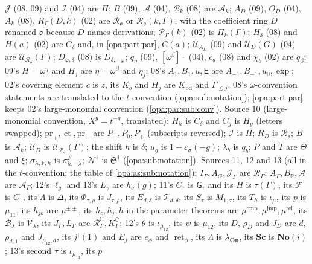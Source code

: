 \documentclass[11pt,oneside]{article}
\numberwithin{equation}{section}
\theoremstyle{definition}
\theoremstyle{remark}
\newcommand{\SC}{\mathbf{No}(i)}
\newcommand{\R}{\mathbb R}
\newcommand{\C}{\mathbb C}
\newcommand{\oo}{\mathfrak o}
\newcommand{\Ak}{\mathcal A_k}
\newcommand{\Ro}{\mathcal R_{\oo}}
\newcommand{\UU}{\mathcal U}
\newcommand{\ct}{\operatorname{ct}}
\newcommand{\gap}{\mathsf G}
\newcommand{\On}{\mathbf{On}}
\newcommand{\ret}{\operatorname{ret}}
\begin{document}
$\mathcal J$ (08, 09) and $\mathcal I$ (04) are $\Pi$; $B$ (09), $\mathcal A$ (04),
$\mathcal B_k$ (08) are $\Ak$; $A_D$ (09), $O_D$ (04), $A_k$ (08), $R_\Gamma(D,k)$ (02) are
$\Ro$ or $\mathcal R_\oo(k,\Gamma)$, with the coefficient ring $D$ renamed $\oo$ because
$D$ names derivations; $\mathcal P_\Gamma(k)$ (02) is $\Pi_k(\Gamma)$; $H_\delta$ (08) and
$H(a)$ (02) are $C_\delta$ and, in \cref{opa:part:par}, $C(a)$; $\UU_{A_D}$ (09) and $\mathcal U_D(G)$ (04) are
$\UU_{\Ro}(\Gamma)$; $D_{\varphi,\delta}$ (08) is $D_{\delta,-\varphi}$; $q_\eta$ (09),
$[\omega^\beta]\cdot$ (04), $c_a$ (08) and $\chi_b$ (02) are $q_\beta$; 09's $H=\omega^\eta$ and
$H_j$ are $\eta=\omega^\beta$ and $\eta_j$; 08's $A_1,B_1,u,\mathsf E$ are
$A_{-1},B_{-1},u_0,\exp$; 02's covering element $c$ is $z$, its $K_b$ and $H_j$ are
$K_{\mathrm{bd}}$ and $\Gamma_{\le j}$. 08's $\omega$-convention statements are translated to
the $t$-convention (\cref{opa:sub:notation}); \cref{opa:part:par} keeps 02's
large-monomial convention (\cref{opa:par:sub:conv}). Source 10 (large-monomial
convention, $X^g=t^{-g}$, translated): $H_h$ is $C_\delta$ and $C_g$ is $H_g$ (letters
swapped); $\mathrm{pr}_+,\ct,\mathrm{pr}_-$ are $P_-,P_0,P_+$ (subscripts reversed);
$\mathcal I$ is $\Pi$; $R_D$ is $\Ro$; $B$ is $\Ak$; $\mathcal U_D$ is $\UU_{\Ro}(\Gamma)$; the
shift $h$ is $\delta$; $u_g$ is $1+\varepsilon_\sigma(-g)$; $\lambda_b$ is $q_b$; $P$ and $T$
are $\Theta$ and $\xi$; $\sigma_{\lambda,F,h}$ is $\sigma^F_{h,-\lambda}$;
$\mathcal N^\dagger$ is $\mathfrak S^\dagger$ (\cref{opa:sub:notation}).
Sources 11, 12 and 13 (all in the $t$-convention; the table of \cref{opa:as:sub:notation}):
$I_\Gamma,A_G,\mathcal J_\Gamma$ are $\mathcal R_\Gamma$; $A_\Gamma,B_\R,\mathcal A$ are
$\mathcal A_\Gamma$; 12's $\ell_g$ and 13's $L_\gamma$ are $h_\sigma(g)$; 11's $C_\tau$ is
$\gap_\tau$ and its $H$ is $\tau(\Gamma)$, its $\mathcal F$ is $C_1$, its $\Lambda$ is $\Delta$,
its $\Phi_{\tau,\rho}$ is $J_{\tau,\rho}$, its $E_{d,\delta}$ is $\mathcal T_{d,\delta}$, its $S_\tau$
is $M_{1,\tau}$, its $T_h$ is $\iota_\mu$, its $p$ is $\mu_{11}$, its $h_{jk}$ are
$\mu^{\pm\pm}$, its $h_c,h_j,h$ in the parameter theorems are
$\mu^{\mathrm{cmp}},\mu^{\mathrm{jmp}},\mu^{\mathrm{rel}}$, its $\mathcal B_\lambda$ is
$\mathcal V_\lambda$, its $J_\Gamma,L_\Gamma$ are $\mathcal R^\C_\Gamma,K^\C_\Gamma$; 12's
$\theta$ is $\iota_{\mu_{12}}$, its $\psi$ is $\mu_{12}$, its $D$, $\rho_D$ and $J_D$ are $d$,
$\rho_{d,1}$ and $J_{\mu_{12},d}$, its $j^\dagger(1)$ and $E_j$ are $e_\phi$ and $\ret_\phi$, its
$\Lambda$ is $\lambda_{\On}$, its $\mathbf{Sc}$ is $\SC$; 13's second $\tau$ is $\iota_{\mu_{13}}$, its $p$
\end{document}
